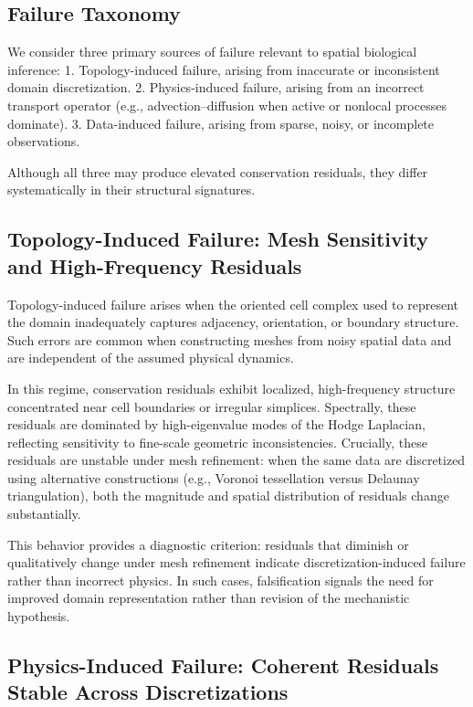\documentclass[10pt,article]{article}
\begin{document}
\subsection{Failure Taxonomy}

We consider three primary sources of failure relevant to spatial biological inference:
	1.	Topology-induced failure, arising from inaccurate or inconsistent domain discretization.
	2.	Physics-induced failure, arising from an incorrect transport operator (e.g., advection–diffusion when active or nonlocal processes dominate).
	3.	Data-induced failure, arising from sparse, noisy, or incomplete observations.

Although all three may produce elevated conservation residuals, they differ systematically in their structural signatures.


\subsection{Topology-Induced Failure: Mesh Sensitivity and High-Frequency Residuals}

Topology-induced failure arises when the oriented cell complex used to represent the domain inadequately captures adjacency, orientation, or boundary structure. Such errors are common when constructing meshes from noisy spatial data and are independent of the assumed physical dynamics.

In this regime, conservation residuals exhibit localized, high-frequency structure concentrated near cell boundaries or irregular simplices. Spectrally, these residuals are dominated by high-eigenvalue modes of the Hodge Laplacian, reflecting sensitivity to fine-scale geometric inconsistencies. Crucially, these residuals are unstable under mesh refinement: when the same data are discretized using alternative constructions (e.g., Voronoi tessellation versus Delaunay triangulation), both the magnitude and spatial distribution of residuals change substantially.

This behavior provides a diagnostic criterion: residuals that diminish or qualitatively change under mesh refinement indicate discretization-induced failure rather than incorrect physics. In such cases, falsification signals the need for improved domain representation rather than revision of the mechanistic hypothesis.


\subsection{Physics-Induced Failure: Coherent Residuals Stable Across Discretizations}
\end{document}
